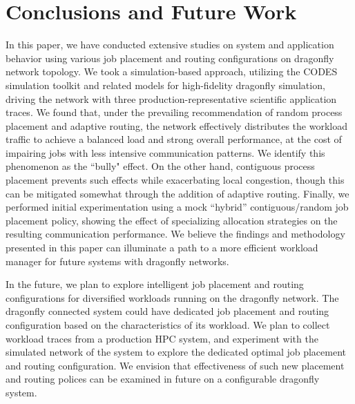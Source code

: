 \section{Conclusions and Future Work}
\label{sec:conclusion}

In this paper, we have conducted extensive studies on system and application behavior using various job placement and routing configurations on dragonfly network topology. We took a simulation-based approach, utilizing the CODES simulation toolkit and related models for high-fidelity dragonfly simulation, driving the network with three production-representative scientific application traces. We found that, under the prevailing recommendation of random process placement and adaptive routing, the network effectively distributes the workload traffic to achieve a balanced load and strong overall performance, at the cost of impairing jobs with less intensive communication patterns. We identify this phenomenon as the ``bully" effect. On the other hand, contiguous process placement prevents such effects while exacerbating local congestion, though this can be mitigated somewhat through the addition of adaptive routing. Finally, we performed initial experimentation using a mock ``hybrid'' contiguous/random job placement policy, showing the effect of specializing allocation strategies on the resulting communication performance.
We believe the findings and methodology presented in this paper can illuminate a path to a more efficient workload manager for future systems with dragonfly networks. 

In the future, we plan to explore intelligent job placement and routing configurations for diversified workloads running on the dragonfly network. The dragonfly connected system could have dedicated job placement and routing configuration based on the characteristics of its workload. We plan to collect workload traces from a production HPC system, and experiment with the simulated network of the system to explore the dedicated optimal job placement and routing configuration. We envision that effectiveness of such new placement and routing polices can be examined in future on a configurable dragonfly system. 

